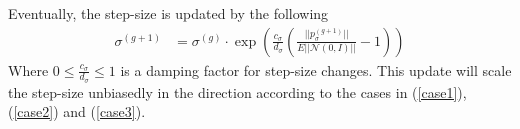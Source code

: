 Eventually, the step-size is updated by the following
\begin{align}
\sigma^{(g+1)} &= \sigma^{(g)} \cdot \exp \left( \frac{c_{\sigma}}{d_{\sigma}} \left( \frac{||p_\sigma^{(g+1)}||}{E|| \mathcal{N}(0, I) ||} - 1 \right) \right)
\end{align}
Where $0 \leq \frac{c_\sigma}{d_\sigma} \leq 1$ is a damping factor for step-size changes.
This update will scale the step-size unbiasedly in the direction 
according to the cases in 
(\ref{case1}), (\ref{case2}) and (\ref{case3}).









